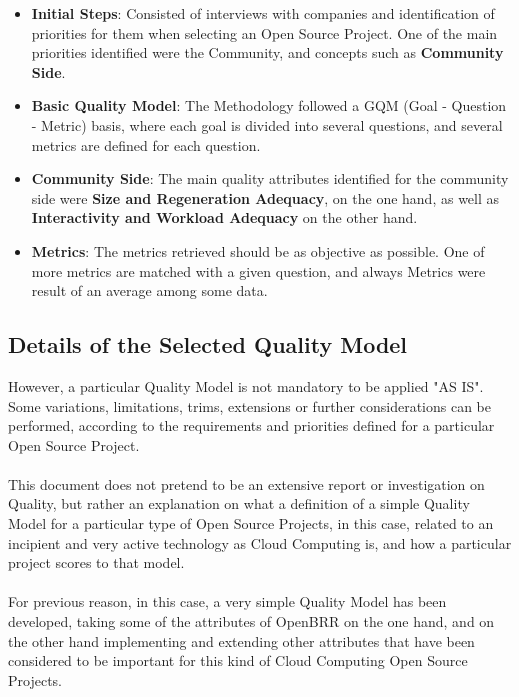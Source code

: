 \documentclass[11pt]{article}
\begin{document}
\begin{itemize}
\begin{itemize}
\begin{itemize}\itemsep0pt
\item{\textbf{Initial Steps}}: Consisted of interviews with companies and identification of priorities for them when selecting an Open Source Project. One of the main priorities identified were the Community, and concepts such as \textbf{Community Side}.
\item{\textbf{Basic Quality Model}}: The Methodology followed a GQM (Goal - Question - Metric) basis, where each goal  is divided into several questions, and several metrics are defined for each question.
\item{\textbf{Community Side}}: The main quality attributes identified for the community side were \textbf{Size and Regeneration Adequacy}, on the one hand, as well as \textbf{Interactivity and Workload Adequacy} on the other hand. 
\item{\textbf{Metrics}}: The metrics retrieved should be as objective as possible. One of more metrics are matched with a given question, and always Metrics were result of an average among some data. 
\end{itemize}

\end{itemize}
\end{itemize}

\subsection{Details of the Selected Quality Model}
However, a particular Quality Model is not mandatory to be applied "AS IS". Some variations, limitations, trims, extensions or further considerations can be performed, according to the requirements and priorities defined for a particular Open Source Project.\\
\\
This document does not pretend to be an extensive report or investigation on Quality, but rather an explanation on what a definition of a simple Quality Model for a particular type of Open Source Projects, in this case, related to an incipient and very active technology as Cloud Computing is, and how a particular project scores to that model.\\
\\
For previous reason, in this case, a very simple Quality Model has been developed, taking some of the attributes of OpenBRR on the one hand, and on the other hand implementing and extending other attributes that have been considered to be important for this kind of Cloud Computing Open Source Projects.
\end{document}

